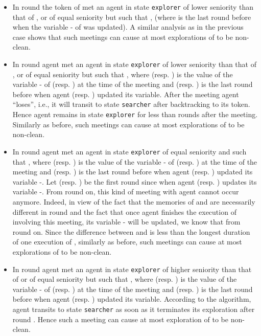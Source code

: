 \documentclass[11pt]{article}
\newcommand{\qed}{\hfill  \bigbreak}
\newenvironment{proof}{\noindent {\bf Proof.}}{\qed}
\begin{document}
\begin{proof}
\begin{itemize}
   
     \item
     {In round } the token  of  met an agent   in state {\tt explorer} of lower seniority than that of , or of equal seniority but such that , {(where  is the last round before  when the variable - of  was updated)}.
     A similar analysis as in the previous case shows that such meetings {can cause at most  explorations  of  to be non-clean.}  
     \item
    {In round  agent  met an agent  in state {\tt explorer} of lower seniority than that of , or of equal seniority but such that , where  (resp. ) is the value of the variable - of  (resp. ) at the time of the meeting and  (resp. ) is the last round before  when agent  (resp. ) updated its variable. After the meeting agent  ``loses'', i.e., it will transit to state {\tt searcher} after backtracking
     to its token. Hence agent  remains in state {\tt explorer} for less than  rounds after the meeting. Similarly as before, such meetings can cause at most   explorations  of  to be non-clean.}

\item
    {In round  agent  met an agent  in state {\tt explorer} of equal seniority and such that , where  (resp. ) is the value of the variable - of  (resp. ) at the time of the meeting and  (resp. ) is the last round before  when agent  (resp. ) updated its variable -. Let  (resp. ) be the first round since  when agent  (resp. ) updates its variable -. From round  on, this kind of meeting with agent  cannot occur anymore. Indeed, in view of the fact that the memories of  and  are necessarily different in round  and the fact that once agent  finishes the execution of  involving this meeting, its variable - will be updated, we know that   from round  on. Since the difference between  and  is less than the longest duration of one execution of , similarly as before, such meetings can cause at most   explorations  of  to be non-clean.}

\item
   {In round  agent  met an agent  in state {\tt explorer} of higher seniority than that of  or of equal seniority but such that , where  (resp. ) is the value of the variable - of  (resp. ) at the time of the meeting and  (resp. ) is the last round before  when agent  (resp. ) updated its variable. According to the algorithm, agent  transits to state {\tt searcher} as soon as it terminates its exploration  after round . Hence such a meeting can cause at most  exploration  of  to be non-clean.}    
     

\end{itemize}
\end{proof}
\end{document}
